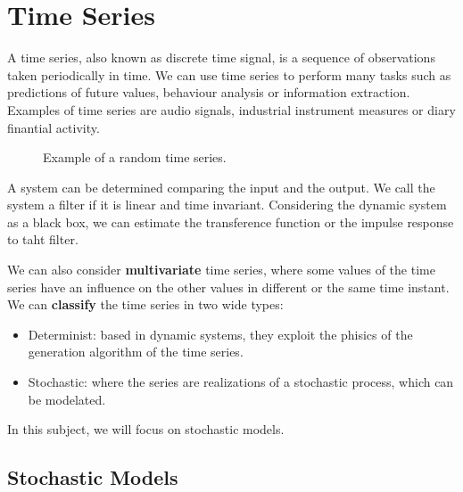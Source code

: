 \section{Time Series}

A time series, also known as discrete time signal, is a sequence of observations taken periodically in time. We can use time series to perform many tasks such as predictions of future values, behaviour analysis or information extraction. Examples of time series are audio signals, industrial instrument measures or diary finantial activity.

\begin{figure}[H]
  \centering
  
  \caption{Example of a random time series.}
\end{figure}
A system can be determined comparing the input and the output. We call the system a filter if it is linear and time invariant. Considering the dynamic system as a black box, we can estimate the transference function or the impulse response to taht filter.

We can also consider \textbf{multivariate} time series, where some values of the time series have an influence on the other values in different or the same time instant. We can \textbf{classify} the time series in two wide types:

\begin{itemize}
  \item Determinist: based in dynamic systems, they exploit the phisics of the generation algorithm of the time series.
        \item Stochastic: where the series are realizations of a stochastic process, which can be modelated.
\end{itemize}

In this subject, we will focus on stochastic models.

\subsection{Stochastic Models}

